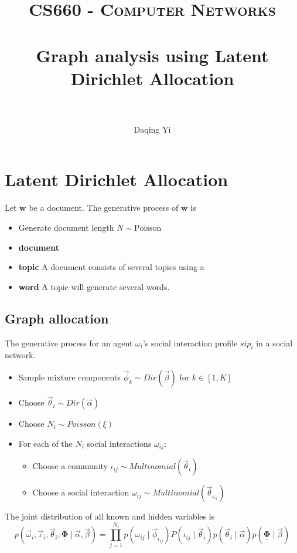 \documentclass[paper=a4, fontsize=11pt]{scrartcl}
\title{
		\usefont{OT1}{bch}{b}{n}
		\normalfont \normalsize \textsc{CS660 - Computer Networks} \\ [25pt]
		\horrule{0.5pt} \\[0.4cm]
		\huge Graph analysis using Latent Dirichlet Allocation \\
		\horrule{2pt} \\[0.5cm]
}
\author{
		\normalfont %
        Daqing Yi \\
}
\begin{document}
\maketitle

\section{Latent Dirichlet Allocation}

Let $ \textbf{w} $ be a document.
The generative process of $ \textbf{w} $ is
\begin{itemize}
\item Generate document length $ N \sim \mbox{Poisson} $
\item \textbf{document}  
\item \textbf{topic} A document consists of several topics using a 
\item \textbf{word} A topic will generate several words.
\end{itemize}

\subsection{Graph allocation}

The generative process for an agent $ \omega_{i} $'s social interaction profile $ sip_{i} $ in a social network.
\begin{itemize}
\item Sample mixture components $ \vec{\phi}_{k} \sim Dir(\vec{\beta}) $ for $ k \in [1, K] $
\item Choose $ \vec{\theta}_{i} \sim Dir(\vec{\alpha}) $ 
\item Choose $ N_{i}  \sim Poisson(\xi) $
\item For each of the $ N_{i} $ social interactions $ \omega_{ij} $:
	\begin{itemize}
		\item Choose a community $ \iota_{ij} \sim Multinomial( \vec{\theta}_{i} ) $
		\item Choose a social interaction $ \omega_{ij} \sim Multinomial( \vec{\theta}_{\iota_{ij}} ) $	
	\end{itemize}
\end{itemize}

The joint distribution of all known and hidden variables is
\begin{equation}
p( \vec{\omega}_{i} , \vec{\iota}_{i}, \vec{\theta}_{i} , \underline{\mathbf{\Phi}}  \mid \vec{\alpha} , \vec{\beta} ) = \prod_{j=1}^{N_{i}} 
p( \omega_{ij} \mid \vec{\phi}_{\iota_{ij}} ) P( \iota_{ij} \mid \vec{\theta}_{i} )
p( \vec{\theta}_{i} \mid \vec{\alpha} ) p( \underline{\mathbf{\Phi}} \mid \vec{\beta} )
\end{equation}



\end{document}
